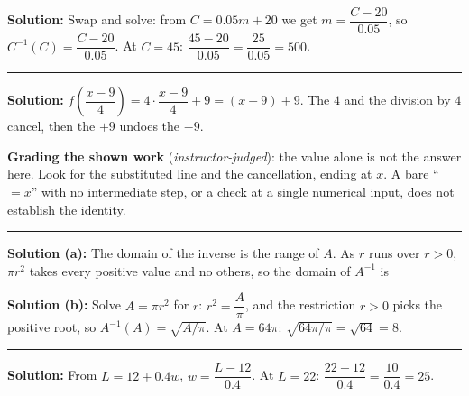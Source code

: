 \documentclass[12pt]{article}
\begin{document}



\textbf{Solution:} Swap and solve: from $C = 0.05m + 20$ we get $m = \dfrac{C - 20}{0.05}$, so $C^{-1}(C) = \dfrac{C - 20}{0.05}$. At $C = 45$: $\dfrac{45 - 20}{0.05} = \dfrac{25}{0.05} = 500$. 

\vspace{0.1cm}\noindent\rule{\linewidth}{0.2pt}


\textbf{Solution:} $f\!\left(\dfrac{x - 9}{4}\right) = 4 \cdot \dfrac{x - 9}{4} + 9 = (x - 9) + 9$. The $4$ and the division by $4$ cancel, then the $+9$ undoes the $-9$. 

\textbf{Grading the shown work} (\emph{instructor-judged}): the value alone is not the answer here. Look for the substituted line and the cancellation, ending at $x$. A bare ``$= x$'' with no intermediate step, or a check at a single numerical input, does not establish the identity.

\vspace{0.1cm}\noindent\rule{\linewidth}{0.2pt}


\textbf{Solution (a):} The domain of the inverse is the range of $A$. As $r$ runs over $r > 0$, $\pi r^{2}$ takes every positive value and no others, so the domain of $A^{-1}$ is 

\textbf{Solution (b):} Solve $A = \pi r^{2}$ for $r$: $r^{2} = \dfrac{A}{\pi}$, and the restriction $r > 0$ picks the positive root, so $A^{-1}(A) = \sqrt{A/\pi}$. At $A = 64\pi$: $\sqrt{64\pi/\pi} = \sqrt{64} = 8$. 

\vspace{0.1cm}\noindent\rule{\linewidth}{0.2pt}


\textbf{Solution:} From $L = 12 + 0.4w$, $w = \dfrac{L - 12}{0.4}$. At $L = 22$: $\dfrac{22 - 12}{0.4} = \dfrac{10}{0.4} = 25$. 
\end{document}
